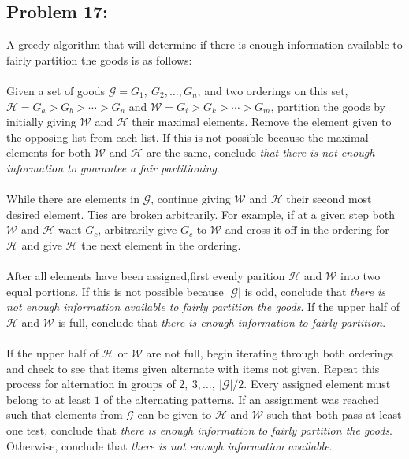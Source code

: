 \documentclass[12pt]{article}
\begin{document}
\subsection*{Problem 17:}
A greedy algorithm that will determine if there is enough
information available to fairly partition the goods is as 
follows:\\\\
Given a set of goods $\mathcal{G}={G_1,\ G_2,\dots,G_n}$,
and two orderings on this set, $\mathcal{H}=G_a > G_b >
\cdots > G_n$ and $\mathcal{W}=G_i > G_k > \cdots > G_m$,
partition the goods by initially giving $\mathcal{W}$ and 
$\mathcal{H}$ their maximal elements.
Remove the element given to the opposing list from each list.
If this is not possible
because the maximal elements for both $\mathcal{W}$ and
$\mathcal{H}$ are the same, conclude \textit{that there is not
enough information to guarantee a fair partitioning}.\\\\  
While there are elements in $\mathcal{G}$, continue
giving $\mathcal{W}$ and $\mathcal{H}$ their second
most desired element.  Ties are broken arbitrarily.  For 
example, if at a given step both $\mathcal{W}$ and $\mathcal{H}$
want $G_c$, arbitrarily give $G_c$ to $\mathcal{W}$ and
cross it off in the ordering for $\mathcal{H}$ and give
$\mathcal{H}$ the next element in the ordering.\\\\
After all elements have been assigned,first evenly parition  
$\mathcal{H}$ and $\mathcal{W}$ into two equal portions.
If this is not possible because $|\mathcal{G}|$ is odd,
conclude that \textit{there is not enough information available
to fairly partition the goods}.  If the upper half of  
$\mathcal{H}$ and $\mathcal{W}$ is full, conclude that 
\textit{there is enough information to fairly partition}.\\\\
If the upper half of $\mathcal{H}$ or $\mathcal{W}$ are
not full, begin iterating through both orderings and 
check to see that items given alternate with items not given.
Repeat this process for alternation in groups of $2,\ 3,\dots
,\ |\mathcal{G}|/2$.  Every assigned element must belong
to at least $1$ of the alternating patterns.
If an assignment was reached such that elements from $\mathcal{G}$
can be given to $\mathcal{H}$ and $\mathcal{W}$ such that both
pass at least one test, conclude that \textit{there is enough
information to fairly partition the goods}.  Otherwise, conclude
that \textit{there is not enough information available}.
\end{document}
